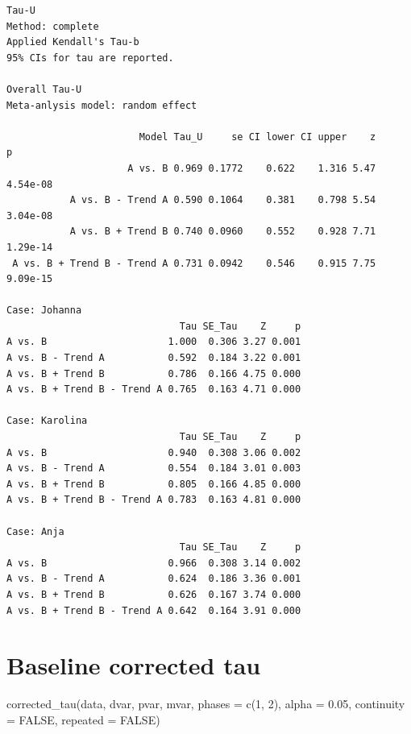 \documentclass[
  letterpaper,
  DIV=11,
  numbers=noendperiod]{scrreprt}
\begin{document}
\begin{verbatim}
Tau-U
Method: complete 
Applied Kendall's Tau-b
95% CIs for tau are reported.

Overall Tau-U
Meta-anlysis model: random effect

                       Model Tau_U     se CI lower CI upper    z        p
                     A vs. B 0.969 0.1772    0.622    1.316 5.47 4.54e-08
           A vs. B - Trend A 0.590 0.1064    0.381    0.798 5.54 3.04e-08
           A vs. B + Trend B 0.740 0.0960    0.552    0.928 7.71 1.29e-14
 A vs. B + Trend B - Trend A 0.731 0.0942    0.546    0.915 7.75 9.09e-15

Case: Johanna 
                              Tau SE_Tau    Z     p
A vs. B                     1.000  0.306 3.27 0.001
A vs. B - Trend A           0.592  0.184 3.22 0.001
A vs. B + Trend B           0.786  0.166 4.75 0.000
A vs. B + Trend B - Trend A 0.765  0.163 4.71 0.000

Case: Karolina 
                              Tau SE_Tau    Z     p
A vs. B                     0.940  0.308 3.06 0.002
A vs. B - Trend A           0.554  0.184 3.01 0.003
A vs. B + Trend B           0.805  0.166 4.85 0.000
A vs. B + Trend B - Trend A 0.783  0.163 4.81 0.000

Case: Anja 
                              Tau SE_Tau    Z     p
A vs. B                     0.966  0.308 3.14 0.002
A vs. B - Trend A           0.624  0.186 3.36 0.001
A vs. B + Trend B           0.626  0.167 3.74 0.000
A vs. B + Trend B - Trend A 0.642  0.164 3.91 0.000
\end{verbatim}

\hypertarget{baseline-corrected-tau}{%
\section{Baseline corrected tau}\label{baseline-corrected-tau}}

\begin{tcolorbox}[enhanced jigsaw, toprule=.15mm, colframe=quarto-callout-tip-color-frame, left=2mm, colback=white, breakable, bottomrule=.15mm, arc=.35mm, rightrule=.15mm, leftrule=.75mm, opacityback=0]
\begin{minipage}[t]{5.5mm}
\textcolor{quarto-callout-tip-color}{\faLightbulb}
\end{minipage}%
\begin{minipage}[t]{\textwidth - 5.5mm}
corrected\_tau(data, dvar, pvar, mvar, phases = c(1, 2), alpha = 0.05,
continuity = FALSE, repeated = FALSE)\end{minipage}%
\end{tcolorbox}
\end{document}
